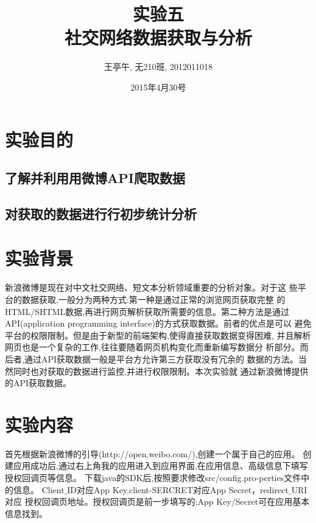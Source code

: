 \documentclass{article}
\begin{document}
\title{实验五\\社交网络数据获取与分析}
\author{王亭午, 无210班, 2012011018}
\date{2015年4月30号}
\maketitle
\section{实验目的}
\subsection{了解并利用用微博API爬取数据}
\subsection{对获取的数据进行行初步统计分析}
\section{实验背景}
新浪微博是现在对中文社交网络、短文本分析领域重要的分析对象。对于这
些平台的数据获取,一般分为两种方式:第一种是通过正常的浏览网页获取完整
的HTML/SHTML数据,再进行网页解析获取所需要的信息。第二种方法是通过
API(application programming interface)的方式获取数据。前者的优点是可以
避免平台的权限限制。但是由于新型的前端架构,使得直接获取数据变得困难,
并且解析网页也是一个复杂的工作,往往要随着网页机构变化而重新编写数据分
析部分。而后者,通过API获取数据一般是平台方允许第三方获取没有冗余的
数据的方法。当然同时也对获取的数据进行监控,并进行权限限制。本次实验就
通过新浪微博提供的API获取数据。
\section{实验内容}
首先根据新浪微博的引导(http://open.weibo.com/),创建一个属于自己的应用。
创建应用成功后,通过右上角我的应用进入到应用界面,在应用信息、高级信息下填写授权回调页等信息。
下载java的SDK后,按照要求修改src/config.pro-perties文件中的信息。
Client\(\_\)ID对应App Key,client-SERCRET对应App Secret，redirect\(\_\)URI对应
授权回调页地址。授权回调页是前一步填写的;App Key/Secret可在应用基本信息找到。
\end{document}
